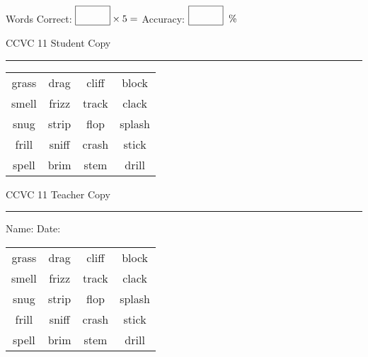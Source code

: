 \documentclass{memoir}
\begin{document}
\normalsize

Words Correct: $\fbox{\phantom{\huge 100}} \times 5 = $ Accuracy: $\fbox{\phantom{\huge 100}}\;\; \%$ 

\vfill

\newpage


\footnotesize \noindent
CCVC 11 \hfill Student Copy
\smallskip
\hrule

\Large

\setlength{\tabcolsep}{14pt}
\def\arraystretch{3}

{\selectfont


\begin{vplace}[0.5]
\begin{center}
\begin{tabular}{cccc}
grass                    & drag        & cliff            & block \\
smell & frizz & track       & clack             \\
snug & strip & flop & splash \\
frill & sniff & crash & stick \\
spell & brim      & stem & drill \\
\end{tabular}
\end{center}
\end{vplace}

}

\newpage

\footnotesize \noindent
CCVC 11 \hfill Teacher Copy
\smallskip
\hrule

\normalsize

\vfill

\noindent
Name: \underline{\hspace{1.75in}} \hfill Date: \underline{\hspace{1in}}

\Large

{\selectfont


\begin{vplace}[0.5]
\begin{center}
\begin{tabular}{cccc}
grass                    & drag        & cliff            & block \\
smell & frizz & track       & clack             \\
snug & strip & flop & splash \\
frill & sniff & crash & stick \\
spell & brim      & stem & drill \\
\end{tabular}
\end{center}
\end{vplace}



}
\end{document}
